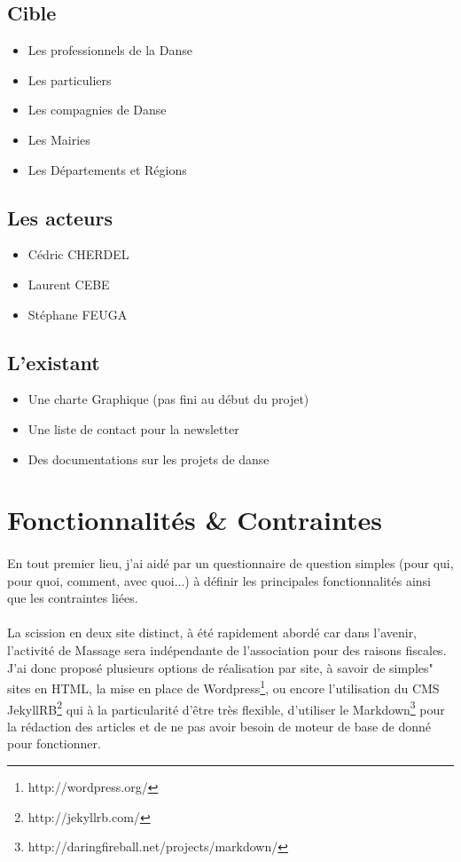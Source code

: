 \documentclass[11pt,a4paper]{report}
\begin{document}
		\subsection{Cible}
			\begin{itemize}
				\item Les professionnels de la Danse
				\item Les particuliers
				\item Les compagnies de Danse
				\item Les Mairies
				\item Les Départements et Régions
			\end{itemize}
		\subsection{Les acteurs}
			\begin{itemize}
				\item Cédric CHERDEL
				\item Laurent CEBE
				\item Stéphane FEUGA
			\end{itemize}
		\subsection{L'existant}
			\begin{itemize}
				\item Une charte Graphique (pas fini au début du projet)
				\item Une liste de contact pour la newsletter
				\item Des documentations sur les projets de danse
			\end{itemize}
	\section{Fonctionnalités \& Contraintes}
		\paragraph*{}En tout premier lieu, j'ai aidé par un questionnaire de question simples (pour qui, pour quoi, comment, avec quoi...) à définir les principales fonctionnalités ainsi que les contraintes liées.
		\paragraph*{}La scission en deux site distinct, à été rapidement abordé car dans l'avenir, l'activité de Massage sera indépendante de l'association pour des raisons fiscales. J'ai donc proposé plusieurs options de réalisation par site, à savoir de simples" sites en HTML, la mise en place de Wordpress\footnote{http://wordpress.org/}, ou encore l'utilisation du CMS JekyllRB\footnote{http://jekyllrb.com/} qui à la particularité d'être très flexible, d'utiliser le Markdown\footnote{http://daringfireball.net/projects/markdown/} pour la rédaction des articles et de ne pas avoir besoin de moteur de base de donné pour fonctionner.
\end{document}

